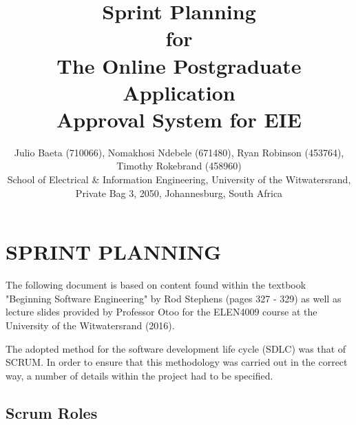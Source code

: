 \documentclass[journal,comsoc,onecolumn]{IEEEtran}
\begin{document}

\title{Sprint Planning \\ \vspace{7mm} for \\ \vspace{7mm} The Online Postgraduate Application \\ Approval System for EIE}

\author{\vspace{3mm} Julio Baeta (710066), Nomakhosi Ndebele (671480), Ryan Robinson (453764), Timothy Rokebrand (458960)\\ \small \vspace{2mm} School of Electrical \& Information Engineering, University of the Witwatersrand, Private Bag 3, 2050, Johannesburg, South Africa}

\markboth{}{}

\maketitle

\thispagestyle{empty}


\newpage

\thispagestyle{empty}

\section{SPRINT PLANNING}


The following document is based on content found within the textbook "Beginning Software Engineering" by Rod Stephens (pages 327 - 329) as well as lecture slides provided by Professor Otoo for the ELEN4009 course at the University of the Witwatersrand (2016). \newline

The adopted method for the software development life cycle (SDLC) was that of SCRUM. In order to ensure that this methodology was carried out in the correct way, a number of details within the project had to be specified.


\subsection{Scrum Roles}
\end{document}
